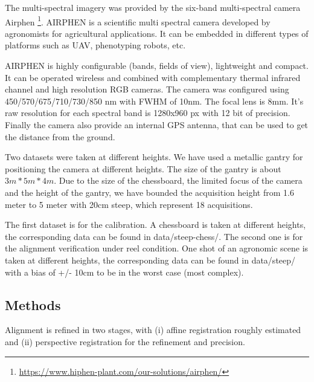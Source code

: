 \documentclass[]{elsarticle}
\begin{document}
	The multi-spectral imagery was provided by the six-band multi-spectral camera Airphen \footnote{\url{https://www.hiphen-plant.com/our-solutions/airphen/}}.
	AIRPHEN is a scientific multi spectral camera developed by agronomists for agricultural applications.
	It can be embedded in different types of platforms such as UAV, phenotyping robots, etc.
	\\
	\par AIRPHEN is highly configurable (bands, fields of view), lightweight and compact.
	It can be operated wireless and combined with complementary thermal infrared channel and high resolution RGB cameras.
	The camera was configured using 450/570/675/710/730/850 nm with FWHM of 10nm.
	The focal lens is 8mm. It's raw resolution for each spectral band is 1280x960 px with 12 bit of precision.
	Finally the camera also provide an internal GPS antenna, that can be used to get the distance from the ground.
	\\
	\par Two datasets were taken at different heights.
	We have used a metallic gantry for positioning the camera at different heights.
	The size of the gantry is about $3m * 5m * 4m$.
	Due to the size of the chessboard, the limited focus of the camera and the height of the gantry,
	we have bounded the acquisition height from 1.6 meter to 5 meter with 20cm steep, which represent 18 acquisitions.
	\\
	\par The first dataset is for the calibration. A chessboard is taken at different heights, the corresponding data can be found in data/steep-chess/.
	The second one is for the alignment verification under reel condition.
	One shot of an agronomic scene is taken at different heights, the corresponding data can be found in data/steep/
	with a bias of +/- 10cm to be in the worst case (most complex).
	
	\subsection{Methods}
	
	Alignment is refined in two stages, with
	(i) affine registration roughly estimated
	and (ii) perspective registration for the refinement and precision.
	
\end{document}
